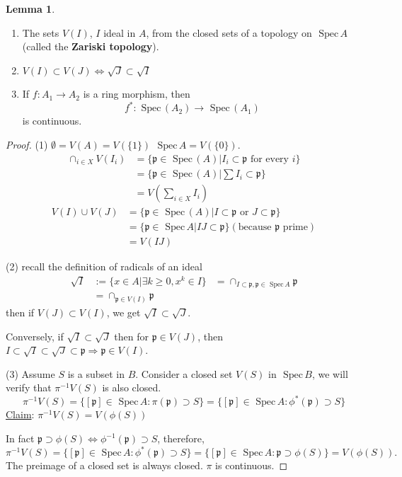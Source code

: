 \documentclass[11pt]{article}
\theoremstyle{definition}
\newtheorem{lemma}[thm]{Lemma}
\newcommand{\spec}{\text{ Spec}\,}
\newcommand{\scp}{{\mathfrak p}}
\newcommand{\Lrta}{\Longrightarrow}
\newcommand{\lrta}{\longrightarrow}
\newcommand{\Llrta}{\Longleftrightarrow}
\begin{document}
\begin{lemma}\ 
\begin{enumerate}[label=(\arabic*)]
\item The sets $V(I)$, $I$ ideal in $A$, from  the closed sets of a topology on $\spec A$ (called the \textbf{Zariski topology}).
\item $V(I)\subset V(J)\Llrta \sqrt{J}\subset \sqrt{I}$
\item If $f: A_1\lrta A_2$ is a ring morphism, then 
$$
f^*:\spec(A_2)\lrta \spec(A_1)
$$
is continuous.
\end{enumerate}
\end{lemma}
\begin{proof}
(1) $\emptyset =V(A)=V(\{1\})$ $\spec A=V(\{0\})$.
$$
\begin{aligned}
\cap_{i\in X}V(I_i)&=\{\scp\in \spec(A)|I_i\subset \scp\text{ for every $i$}\}\\
&=\{\scp\in \spec(A)|\sum I_i\subset \scp\}\\
&= V\left(\sum_{i\in X}I_i\right)
\end{aligned}
$$
$$
\begin{aligned}
V(I)\cup V(J)&=\{\scp\in\spec (A)|I\subset \scp\text{  or } J\subset \scp\}\\
&=\{\scp\in\spec A|I J\subset \scp\}(\text{because $\scp$ prime})\\
&=V(IJ)
\end{aligned}
$$

(2) recall the definition of radicals of an ideal 
$$
\begin{aligned}
\sqrt{I}&:=\{x\in A|\exists k\geq 0, x^k\in I\}
&=\cap_{I\subset \scp,\scp\in\spec A}\scp\\
&=\cap_{\scp \in V(I)}\scp
\end{aligned}
$$
then if $V(J)\subset V(I)$, we get $\sqrt{I}\subset \sqrt{J}$.

Conversely, if $\sqrt{I}\subset \sqrt{J}$ then for $\scp\in V(J)$, then
$I\subset \sqrt{I}\subset\sqrt{J}\subset \scp\Lrta \scp\in V(I)$.

(3) Assume $S$ is a subset in $B$. Consider a closed set $V(S)$ in $\spec B$, we will verify that $\pi^{-1}V(S)$ is also closed.
$$
\pi^{-1}V(S)=\{[\scp]\in \spec A: \pi(\scp)\supset S\}=\{[\scp]\in \spec A: \phi^*(\scp)\supset S\}
$$
\underline{Claim}: $\pi^{-1}V(S)=V(\phi(S))$

In fact $\scp\supset \phi(S)\Llrta \phi^{-1}(\scp)\supset S$, therefore,
$$
\pi^{-1}V(S)=\{[\scp]\in \spec A: \phi^*(\scp)\supset S\}=\{[\scp]\in \spec A: \scp\supset \phi(S)\}=V(\phi(S)).
$$
The preimage of a closed set is always closed. $\pi$ is continuous.
\end{proof}
\end{document}
